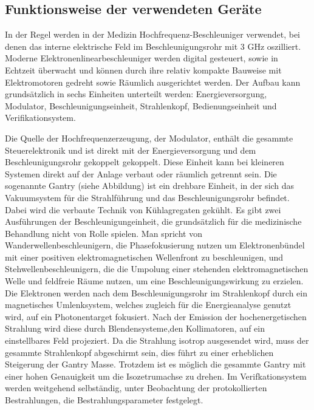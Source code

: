 





\subsection{Funktionsweise der verwendeten Geräte}
In der Regel werden in der Medizin Hochfrequenz-Beschleuniger verwendet, bei denen das interne elektrische Feld 
im Beschleunigungsrohr mit 3 GHz oszilliert. 
Moderne Elektronenlinearbeschleuniger werden digital gesteuert, sowie in Echtzeit überwacht und können durch ihre relativ kompakte Bauweise
mit Elektromotoren gedreht sowie Räumlich ausgerichtet werden.
Der Aufbau kann grundsätzlich in sechs Einheiten unterteilt werden: Energieversorgung, Modulator, Beschleunigungseinheit, Strahlenkopf, Bedienungseinheit und Verifikationsystem. \cite{KriegerHannoSfTu}


Die Quelle der Hochfrequenzerzeugung, der Modulator, enthält die gesammte Steuerelektronik und ist direkt mit der Energieversorgung und dem Beschleunigungsrohr gekoppelt gekoppelt.
Diese Einheit kann bei kleineren Systemen direkt auf der Anlage verbaut oder räumlich getrennt sein.
Die sogenannte Gantry (siehe Abbildung) ist ein drehbare Einheit, in der sich das Vakuumsystem für die Strahlführung und das Beschleunigungsrohr befindet.
Dabei wird die verbaute Technik von Kühlagregaten gekühlt.
Es gibt zwei Ausführungen der Beschleunigungeinheit, die grundsätzlich für die medizinische Behandlung nicht von Rolle spielen.
Man spricht von Wanderwellenbeschleunigern, die Phasefokusierung nutzen um Elektronenbündel mit einer positiven elektromagnetischen Wellenfront zu beschleunigen,
und Stehwellenbeschleunigern, die die Umpolung einer stehenden elektromagnetischen Welle und feldfreie Räume nutzen, um eine Beschleunigungswirkung zu erzielen.
Die Elektronen werden nach dem Beschleunigungsrohr im Strahlenkopf durch ein magnetisches Umlenksystem, welches zugleich für die Energieanalyse genutzt wird, auf ein Photonentarget fokusiert.
Nach der Emission der hochenergetischen Strahlung wird diese durch Blendensysteme,den Kollimatoren, auf ein einstellbares Feld projeziert.
Da die Strahlung isotrop ausgesendet wird, muss der gesammte Strahlenkopf abgeschirmt sein, dies führt zu einer erheblichen Steigerung der Gantry Masse.
Trotzdem ist es möglich die gesammte Gantry mit einer hohen Genauigkeit um die Isozetrumachse zu drehen.
Im Verifkationsystem werden weitgehend selbständig, unter Beobachtung der protokollierten Bestrahlungen, die Bestrahlungsparameter festgelegt.



